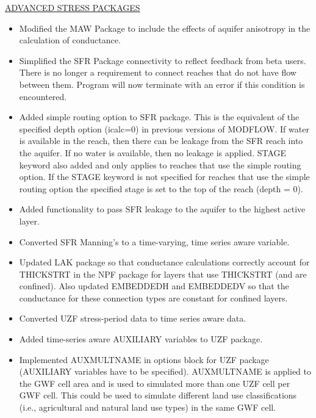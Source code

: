 \documentclass[11pt,twoside,twocolumn]{usgsreport}
\begin{document}
\begin{itemize}
\underline{ADVANCED STRESS PACKAGES}
\begin{itemize}
\item Modified the MAW Package to include the effects of aquifer anisotropy in the calculation of conductance.
\item Simplified the SFR Package connectivity to reflect feedback from beta users. There is no longer a requirement to connect reaches that do not have flow between them.  Program will now terminate with an error if this condition is encountered.
\item Added simple routing option to SFR package. This is the equivalent of the specified depth option (icalc=0) in previous versions of MODFLOW. If water is available in the reach, then there can be leakage from the SFR reach into the aquifer.  If no water is available, then no leakage is applied.  STAGE keyword also added and only applies to reaches that use the simple routing option. If the STAGE keyword is not specified for reaches that use the simple routing option the specified stage is set to the top of the reach (depth = 0).
\item Added functionality to pass SFR leakage to the aquifer to the highest active layer.
\item Converted SFR Manning's to a time-varying, time series aware variable.  
\item Updated LAK package so that conductance calculations correctly account for THICKSTRT in the NPF package for layers that use THICKSTRT (and are confined). Also updated EMBEDDEDH and EMBEDDEDV so that the conductance for these connection types are constant for confined layers.
\item Converted UZF stress-period data to time series aware data.
\item Added time-series aware AUXILIARY variables to UZF package.
\item Implemented AUXMULTNAME in options block for UZF package (AUXILIARY variables have to be specified). AUXMULTNAME is applied to the GWF cell area and is used to simulated more than one UZF cell per GWF cell. This could be used to simulate different land use classifications (i.e., agricultural and natural land use types) in the same GWF cell.
\end{itemize}


\end{itemize}
\end{document}
